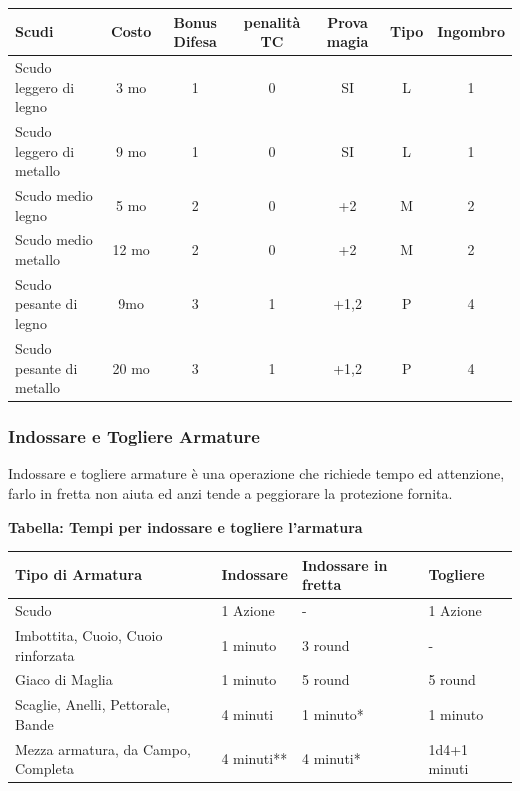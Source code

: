 \noindent\begin{tabular}{lcccccc}
\textbf{Scudi} & \textbf{Costo} & \textbf{Bonus Difesa} & \textbf{penalità TC} & \textbf{Prova magia} & \textbf{Tipo} & \textbf{Ingombro}\\
\toprule
Scudo leggero di legno& 3 mo&1& 0& SI& L & 1\\
Scudo leggero di metallo & 9 mo&1& 0& SI& L& 1\\
Scudo medio legno &5 mo &2& 0& +2& M& 2\\
Scudo medio metallo&12 mo&2& 0& +2& M& 2\\
Scudo pesante di legno & 9mo&3 & 1& +1,2& P& 4\\
Scudo pesante di metallo & 20 mo&3& 1& +1,2& P& 4\\
\end{tabular}

\begin{multicols}{2}

\subsubsection{Indossare e Togliere Armature}

Indossare e togliere armature è una operazione che richiede tempo ed attenzione, farlo in fretta non aiuta ed anzi tende a peggiorare la protezione fornita.

\end{multicols}

\textbf{Tabella: Tempi per indossare e togliere l'armatura}

\medskip

\noindent\begin{tabular}{llll}
\textbf{Tipo di Armatura}& \textbf{Indossare} & \textbf{Indossare in fretta} & \textbf{Togliere}\\
\toprule
Scudo& 1 Azione & - & 1 Azione\\
Imbottita, Cuoio, Cuoio rinforzata& 1 minuto& 3 round& - \\
Giaco di Maglia& 1 minuto& 5 round& 5 round\\
Scaglie, Anelli, Pettorale, Bande & 4 minuti & 1 minuto{*}& 1 minuto\\
Mezza armatura, da Campo, Completa& 4 minuti{*}{*}& 4 minuti{*}& 1d4+1 minuti
\end{tabular}

\bigskip

